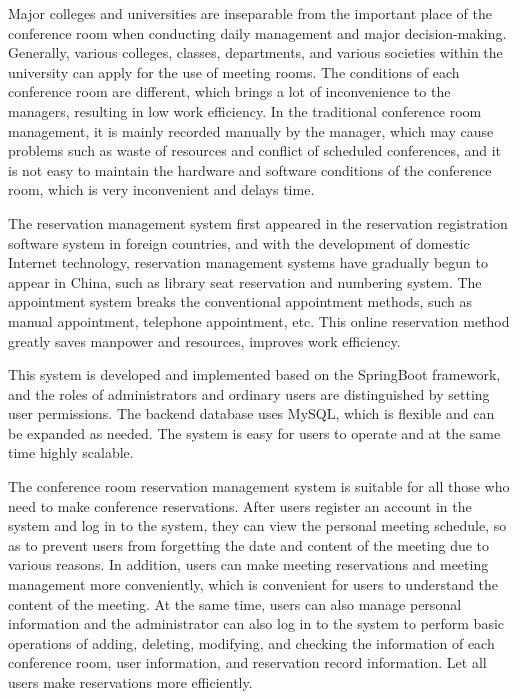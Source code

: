 \documentclass{izdthesis}
\begin{document}
\begin{enabstract}
Major colleges and universities are inseparable from the important place of the conference room when conducting daily management and major decision-making. Generally, various colleges, classes, departments, and various societies within the university can apply for the use of meeting rooms. The conditions of each conference room are different, which brings a lot of inconvenience to the managers, resulting in low work efficiency. In the traditional conference room management, it is mainly recorded manually by the manager, which may cause problems such as waste of resources and conflict of scheduled conferences, and it is not easy to maintain the hardware and software conditions of the conference room, which is very inconvenient and delays time.

The reservation management system first appeared in the reservation registration software system in foreign countries, and with the development of domestic Internet technology, reservation management systems have gradually begun to appear in China, such as library seat reservation and numbering system. The appointment system breaks the conventional appointment methods, such as manual appointment, telephone appointment, etc. This online reservation method greatly saves manpower and resources, improves work efficiency.

This system is developed and implemented based on the SpringBoot framework, and the roles of administrators and ordinary users are distinguished by setting user permissions. The backend database uses MySQL, which is flexible and can be expanded as needed. The system is easy for users to operate and at the same time highly scalable.

The conference room reservation management system is suitable for all those who need to make conference reservations. After users register an account in the system and log in to the system, they can view the personal meeting schedule, so as to prevent users from forgetting the date and content of the meeting due to various reasons. In addition, users can make meeting reservations and meeting management more conveniently, which is convenient for users to understand the content of the meeting. At the same time, users can also manage personal information and the administrator can also log in to the system to perform basic operations of adding, deleting, modifying, and checking the information of each conference room, user information, and reservation record information. Let all users make reservations more efficiently.

\end{enabstract}
\end{document}
